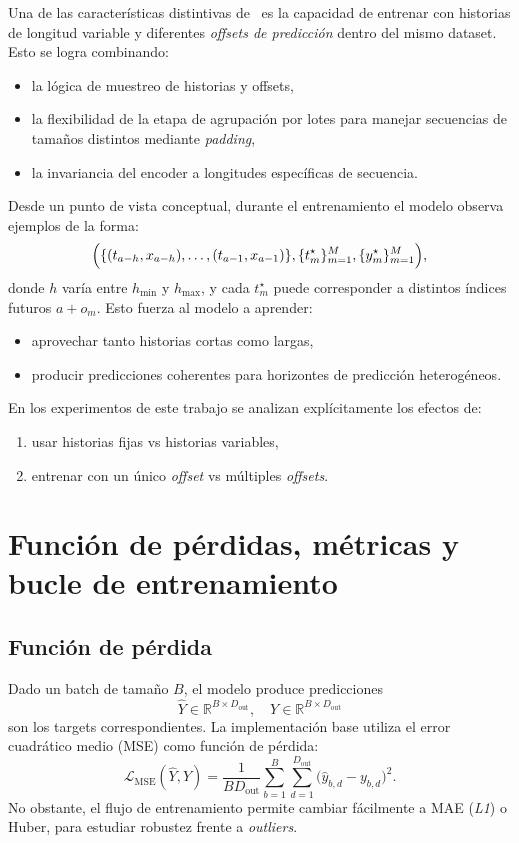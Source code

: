 Una de las características distintivas de \CTTransformer\ es la capacidad de entrenar con historias de longitud variable y diferentes \emph{offsets de predicción} dentro del mismo dataset. Esto se logra combinando:
\begin{itemize}
    \item la lógica de muestreo de historias y offsets,
    \item la flexibilidad de la etapa de agrupación por lotes para manejar secuencias de tamaños distintos mediante \emph{padding},
    \item la invariancia del encoder a longitudes específicas de secuencia.
\end{itemize}

Desde un punto de vista conceptual, durante el entrenamiento el modelo observa ejemplos de la forma:
\[
    \Bigl(\{(t_{a-h}, x_{a-h}), \dots, (t_{a-1}, x_{a-1})\}, \{t^\star_m\}_{m=1}^M, \{y^\star_m\}_{m=1}^M\Bigr),
\]
donde $h$ varía entre $h_{\min}$ y $h_{\max}$, y cada $t^\star_m$ puede corresponder a distintos índices futuros $a + o_m$. Esto fuerza al modelo a aprender:
\begin{itemize}
    \item aprovechar tanto historias cortas como largas,
    \item producir predicciones coherentes para horizontes de predicción heterogéneos.
\end{itemize}

En los experimentos de este trabajo se analizan explícitamente los efectos de:
\begin{enumerate}
    \item usar historias fijas vs historias variables,
    \item entrenar con un único \emph{offset} vs múltiples \emph{offsets}.
\end{enumerate}

\section{Función de pérdidas, métricas y bucle de entrenamiento}
\label{sec:perdidas-y-entrenamiento}

\subsection{Función de pérdida}

Dado un batch de tamaño $B$, el modelo produce predicciones
\[
    \hat{Y} \in \mathbb{R}^{B \times D_{\text{out}}}, \quad
    Y \in \mathbb{R}^{B \times D_{\text{out}}}
\]
son los targets correspondientes. La implementación base utiliza el error cuadrático medio (MSE) como función de pérdida:
\[
    \mathcal{L}_{\text{MSE}}(\hat{Y}, Y) =
        \frac{1}{B D_{\text{out}}} \sum_{b=1}^B \sum_{d=1}^{D_{\text{out}}}
        \bigl(\hat{y}_{b,d} - y_{b,d}\bigr)^2.
\]
No obstante, el flujo de entrenamiento permite cambiar fácilmente a MAE (\emph{L1}) o Huber, para estudiar robustez frente a \emph{outliers}.

